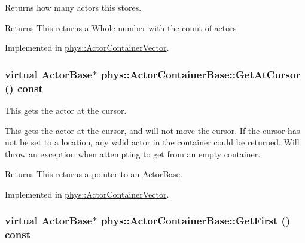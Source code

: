 Returns how many actors this stores. 

\begin{DoxyReturn}{Returns}
This returns a Whole number with the count of actors 
\end{DoxyReturn}


Implemented in \hyperlink{classphys_1_1ActorContainerVector_a6d2e5e68e23f5798ad10ba41e479d0f7}{phys::ActorContainerVector}.

\hypertarget{classphys_1_1ActorContainerBase_a2c8fb86a9e188aece105b2a753ccc19a}{
\subsubsection[{GetAtCursor}]{\setlength{\rightskip}{0pt plus 5cm}virtual {\bf ActorBase}$\ast$ phys::ActorContainerBase::GetAtCursor () const}}
\label{d1/d00/classphys_1_1ActorContainerBase_a2c8fb86a9e188aece105b2a753ccc19a}


This gets the actor at the cursor. 

This gets the actor at the cursor, and will not move the cursor. If the cursor has not be set to a location, any valid actor in the container could be returned. Will throw an exception when attempting to get from an empty container. \begin{DoxyReturn}{Returns}
This returns a pointer to an \hyperlink{classphys_1_1ActorBase}{ActorBase}. 
\end{DoxyReturn}


Implemented in \hyperlink{classphys_1_1ActorContainerVector_a280700490b368a963dd8feae044c7a6d}{phys::ActorContainerVector}.

\hypertarget{classphys_1_1ActorContainerBase_ae703482d84a9c6726e28a8f26418b161}{
\subsubsection[{GetFirst}]{\setlength{\rightskip}{0pt plus 5cm}virtual {\bf ActorBase}$\ast$ phys::ActorContainerBase::GetFirst () const}}
\label{d1/d00/classphys_1_1ActorContainerBase_ae703482d84a9c6726e28a8f26418b161}


